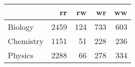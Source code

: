 \begin{tabular}{lrrrr}
\toprule
{} &    rr &   rw &   wr &   ww \\
\midrule
Biology   &  2459 &  124 &  733 &  603 \\
Chemistry &  1151 &   51 &  228 &  236 \\
Physics   &  2288 &   66 &  278 &  334 \\
\bottomrule
\end{tabular}
